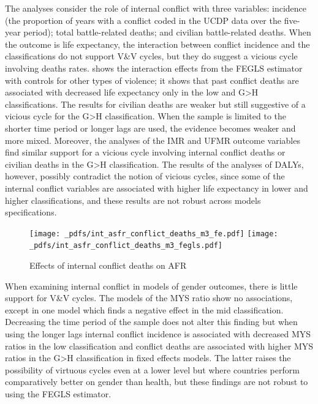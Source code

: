 \documentclass[12pt]{article}
\begin{document}
The analyses consider the role of internal conflict with three variables: incidence (the proportion of years with a conflict coded in the UCDP data over the five-year period); total battle-related deaths; and civilian battle-related deaths. When the outcome is life expectancy, the interaction between conflict incidence and the classifications do not support V\&V cycles, but they do suggest a vicious cycle involving deaths rates.  shows the interaction effects from the FEGLS estimator with controls for other types of violence; it shows that past conflict deaths are associated with decreased life expectancy only in the low and G>H classifications. The results for civilian deaths are weaker but still suggestive of a vicious cycle for the G>H classification. When the sample is limited to the shorter time period or longer lags are used, the evidence becomes weaker and more mixed. Moreover, the analyses of the IMR and UFMR outcome variables find similar support for a vicious cycle involving internal conflict deaths or civilian deaths in the G>H classification. The results of the analyses of DALYs, however, possibly contradict the notion of vicious cycles, since some of the internal conflict variables are associated with higher life expectancy in lower and higher classifications, and these results are not robust across models specifications.

\begin{figure}[!htb]
    \centering
    \caption{Effects of internal conflict deaths on AFR}
    \label{int_asfr_conflict_deaths}
    \texttt{[image: \_pdfs/int\_asfr\_conflict\_deaths\_m3\_fe.pdf]}
    \texttt{[image: \_pdfs/int\_asfr\_conflict\_deaths\_m3\_fegls.pdf]}
\end{figure}

When examining internal conflict in models of gender outcomes, there is little support for V\&V cycles. The models of the MYS ratio show no associations, except in one model which finds a negative effect in the mid classification. Decreasing the time period of the sample does not alter this finding but when using the longer lags internal conflict incidence is associated with decreased MYS ratios in the low classification and conflict deaths are associated with higher MYS ratios in the G>H classification in fixed effects models. The latter raises the possibility of virtuous cycles even at a lower level but where countries perform comparatively better on gender than health, but these findings are not robust to using the FEGLS estimator.
\end{document}
